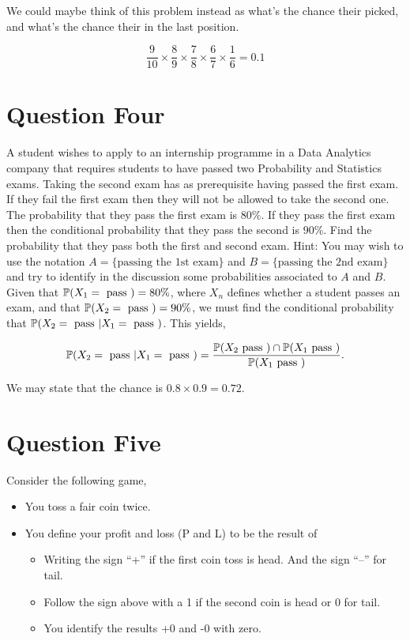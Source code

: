 \documentclass{article}
\begin{document}
            We could maybe think of this problem instead as what's the chance their picked, and what's the chance their in the last position.

            \[\frac{9}{10} \times \frac{8}{9} \times \frac{7}{8} \times \frac{6}{7} \times \frac{1}{6} = 0.1\]

    \section{Question Four}
        A student wishes to apply to an internship programme in a Data Analytics company that requires students to have passed two Probability and Statistics exams. Taking the second exam has as prerequisite having passed the first exam. If they fail the first exam then they will not be allowed to take the second one. The probability that they pass the first exam is 80\%. If they pass the first exam then the conditional probability that they pass the second is 90\%. Find the probability that they pass both the first and second exam. Hint: You may wish to use the notation $A = \{\text{passing the 1st exam}\}$ and $B = \{\text{passing the 2nd exam}\}$ and try to identify in the discussion some probabilities associated to $A$ and $B$.\\

        \ans Given that $\mathbb{P}(X_1 = \text{ pass }) = 80\%$, where $X_n$ defines whether a student passes an exam, and that $\mathbb{P}(X_2 = \text{ pass }) = 90\%$, we must find the conditional probability that $\mathbb{P}(X_2 = \text{ pass } | X_1 = \text{ pass })$. This yields,

        \[\mathbb{P}(X_2 = \text{ pass } | X_1 = \text{ pass }) = \frac{\mathbb{P}(X_2 \text{ pass }) \cap \mathbb{P}(X_1 \text{ pass })}{\mathbb{P}(X_1 \text{ pass })}.\]

        We may state that the chance is $0.8 \times 0.9 = 0.72$.

    \section{Question Five}
        Consider the following game,
        \begin{itemize}
            \item You toss a fair coin twice.
            \item You define your profit and loss (P and L) to be the result of
            \begin{itemize}
                \item Writing the sign “+” if the first coin toss is head. And the sign “–” for tail.
                \item Follow the sign above with a 1 if the second coin is head or 0 for tail.
                \item You identify the results +0 and -0 with zero.
            \end{itemize}
        \end{itemize}
\end{document}
